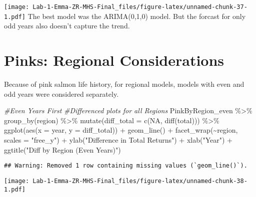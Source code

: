 \documentclass[
]{article}
\newenvironment{Shaded}{\begin{snugshade}}{\end{snugshade}}
\newcommand{\AttributeTok}[1]{\textcolor[rgb]{0.77,0.63,0.00}{#1}}
\newcommand{\CommentTok}[1]{\textcolor[rgb]{0.56,0.35,0.01}{\textit{#1}}}
\newcommand{\ConstantTok}[1]{\textcolor[rgb]{0.00,0.00,0.00}{#1}}
\newcommand{\FunctionTok}[1]{\textcolor[rgb]{0.00,0.00,0.00}{#1}}
\newcommand{\NormalTok}[1]{#1}
\newcommand{\SpecialCharTok}[1]{\textcolor[rgb]{0.00,0.00,0.00}{#1}}
\newcommand{\StringTok}[1]{\textcolor[rgb]{0.31,0.60,0.02}{#1}}
\begin{document}
\texttt{[image: Lab-1-Emma-ZR-MHS-Final\_files/figure-latex/unnamed-chunk-37-1.pdf]}
The best model was the ARIMA(0,1,0) model. But the forcast for only odd
years also doesn't capture the trend.

\hypertarget{pinks-regional-considerations}{%
\section{Pinks: Regional
Considerations}\label{pinks-regional-considerations}}

Because of pink salmon life history, for regional models, models with
even and odd years were considered separately.

\begin{Shaded}
\begin{Highlighting}[]
\CommentTok{\#Even Years First }
\CommentTok{\#Differenced plots for all Regions }
\NormalTok{PinkByRegion\_even }\SpecialCharTok{\%\textgreater{}\%}
  \FunctionTok{group\_by}\NormalTok{(region) }\SpecialCharTok{\%\textgreater{}\%}
  \FunctionTok{mutate}\NormalTok{(}\AttributeTok{diff\_total =} \FunctionTok{c}\NormalTok{(}\ConstantTok{NA}\NormalTok{, }\FunctionTok{diff}\NormalTok{(total))) }\SpecialCharTok{\%\textgreater{}\%}
  \FunctionTok{ggplot}\NormalTok{(}\FunctionTok{aes}\NormalTok{(}\AttributeTok{x =}\NormalTok{ year, }\AttributeTok{y =}\NormalTok{ diff\_total)) }\SpecialCharTok{+}
  \FunctionTok{geom\_line}\NormalTok{() }\SpecialCharTok{+}
  \FunctionTok{facet\_wrap}\NormalTok{(}\SpecialCharTok{\textasciitilde{}}\NormalTok{region, }\AttributeTok{scales =} \StringTok{"free\_y"}\NormalTok{) }\SpecialCharTok{+}
  \FunctionTok{ylab}\NormalTok{(}\StringTok{"Difference in Total Returns"}\NormalTok{) }\SpecialCharTok{+}
  \FunctionTok{xlab}\NormalTok{(}\StringTok{"Year"}\NormalTok{) }\SpecialCharTok{+}
  \FunctionTok{ggtitle}\NormalTok{(}\StringTok{"Diff by Region (Even Years)"}\NormalTok{) }
\end{Highlighting}
\end{Shaded}

\begin{verbatim}
## Warning: Removed 1 row containing missing values (`geom_line()`).
\end{verbatim}

\texttt{[image: Lab-1-Emma-ZR-MHS-Final\_files/figure-latex/unnamed-chunk-38-1.pdf]}
\end{document}
